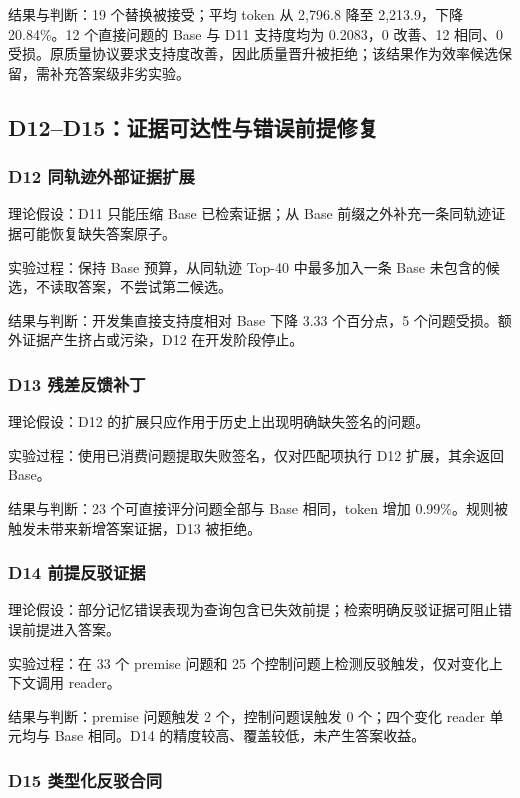 结果与判断：19 个替换被接受；平均 token 从 2,796.8 降至 2,213.9，下降 20.84\%。12 个直接问题的 Base 与 D11 支持度均为 0.2083，0 改善、12 相同、0 受损。原质量协议要求支持度改善，因此质量晋升被拒绝；该结果作为效率候选保留，需补充答案级非劣实验。

\subsection{D12--D15：证据可达性与错误前提修复}

\subsubsection{D12 同轨迹外部证据扩展}

理论假设：D11 只能压缩 Base 已检索证据；从 Base 前缀之外补充一条同轨迹证据可能恢复缺失答案原子。

实验过程：保持 Base 预算，从同轨迹 Top-40 中最多加入一条 Base 未包含的候选，不读取答案，不尝试第二候选。

结果与判断：开发集直接支持度相对 Base 下降 3.33 个百分点，5 个问题受损。额外证据产生挤占或污染，D12 在开发阶段停止。

\subsubsection{D13 残差反馈补丁}

理论假设：D12 的扩展只应作用于历史上出现明确缺失签名的问题。

实验过程：使用已消费问题提取失败签名，仅对匹配项执行 D12 扩展，其余返回 Base。

结果与判断：23 个可直接评分问题全部与 Base 相同，token 增加 0.99\%。规则被触发未带来新增答案证据，D13 被拒绝。

\subsubsection{D14 前提反驳证据}

理论假设：部分记忆错误表现为查询包含已失效前提；检索明确反驳证据可阻止错误前提进入答案。

实验过程：在 33 个 premise 问题和 25 个控制问题上检测反驳触发，仅对变化上下文调用 reader。

结果与判断：premise 问题触发 2 个，控制问题误触发 0 个；四个变化 reader 单元均与 Base 相同。D14 的精度较高、覆盖较低，未产生答案收益。

\subsubsection{D15 类型化反驳合同}

